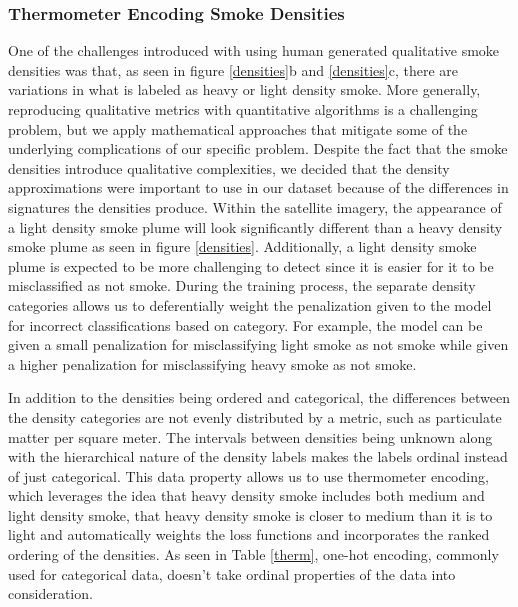 \documentclass{ametsocV6.1}
\begin{document}
\subsubsection*{Thermometer Encoding Smoke Densities}

One of the challenges introduced with using human generated qualitative smoke densities was that, as seen in figure \ref{densities}b and \ref{densities}c, there are variations in what is labeled as heavy or light density smoke. More generally, reproducing qualitative metrics with quantitative algorithms is a challenging problem, but we apply mathematical approaches that mitigate some of the underlying complications of our specific problem. Despite the fact that the smoke densities introduce qualitative complexities, we decided that the density approximations were important to use in our dataset because of the differences in signatures the densities produce. Within the satellite imagery, the appearance of a light density smoke plume will look significantly different than a heavy density smoke plume as seen in figure \ref{densities}. Additionally, a light density smoke plume is expected to be more challenging to detect since it is easier for it to be misclassified as not smoke. During the training process, the separate density categories allows us to deferentially weight the penalization given to the model for incorrect classifications based on category. For example, the model can be given a small penalization for misclassifying light smoke as not smoke while given a higher penalization for misclassifying heavy smoke as not smoke. 

In addition to the densities being ordered and categorical, the differences between the density categories are not evenly distributed by a metric, such as particulate matter per square meter. The intervals between densities being unknown along with the hierarchical nature of the density labels makes the labels ordinal instead of just categorical. This data property allows us to use thermometer encoding, which leverages the idea that heavy density smoke includes both medium and light density smoke, that heavy density smoke is closer to medium than it is to light and automatically weights the loss functions and incorporates the ranked ordering of the densities.  As seen in Table \ref{therm}, one-hot encoding, commonly used for categorical data, doesn't take ordinal properties of the data into consideration.  
\end{document}
